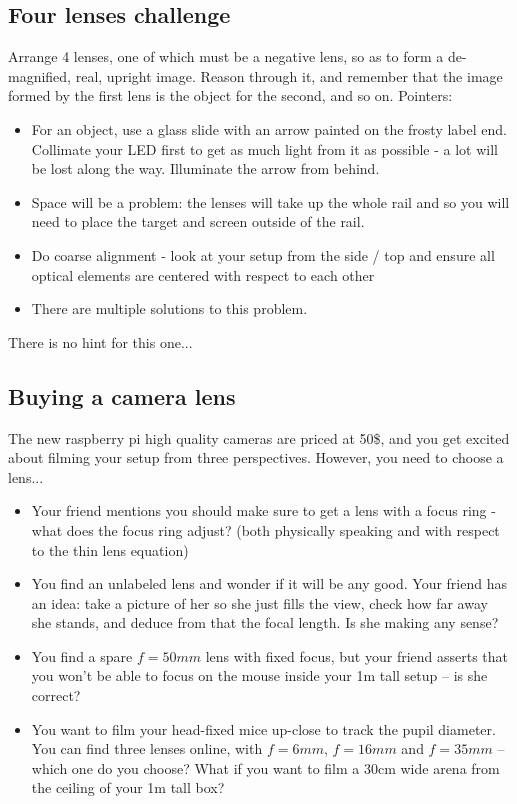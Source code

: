 \documentclass[a4paper]{report}
\begin{document}
    \subsection{Four lenses challenge}
	Arrange 4 lenses, one of which must be a negative lens, so as to form a de-magnified, real, upright image. Reason through it, and remember that the image formed by the first lens is the object for the second, and so on. Pointers: 
	\begin{itemize}
    	\item For an object, use a glass slide with an arrow painted on the frosty label end. Collimate your LED first to get as much light from it as possible - a lot will be lost along the way. Illuminate the arrow from behind.
		\item Space will be a problem: the lenses will take up the whole rail and so you will need to place the target and screen outside of the rail.
		\item Do coarse alignment - look at your setup from the side / top and ensure all optical elements are centered with respect to each other
		\item There are multiple solutions to this problem.
	\end{itemize}
	There is no hint for this one...
	
	
    \subsection{Buying a camera lens}
    \hypertarget{hintBack-buying}{}
    The new raspberry pi high quality cameras are priced at 50\$, and you get excited about filming your setup from three perspectives. However, you need to choose a lens...
    
    \begin{itemize}
        \item Your friend mentions you should make sure to get a lens with a focus ring - what does the focus ring adjust? (both physically speaking and with respect to the thin lens equation)
        \item You find an unlabeled lens and wonder if it will be any good. Your friend has an idea: take a picture of her so she just fills the view, check how far away she stands, and deduce from that the focal length. Is she making any sense?
        \item You find a spare $f=50mm$ lens with fixed focus, but your friend asserts that you won't be able to focus on the mouse inside your 1m tall setup -- is she correct?
        \item You want to film your head-fixed mice up-close to track the pupil diameter. You can find three lenses online, with $f=6mm$, $f=16mm$ and $f=35mm$ -- which one do you choose? What if you want to film a 30cm wide arena from the ceiling of your 1m tall box?
    \end{itemize}
\end{document}
